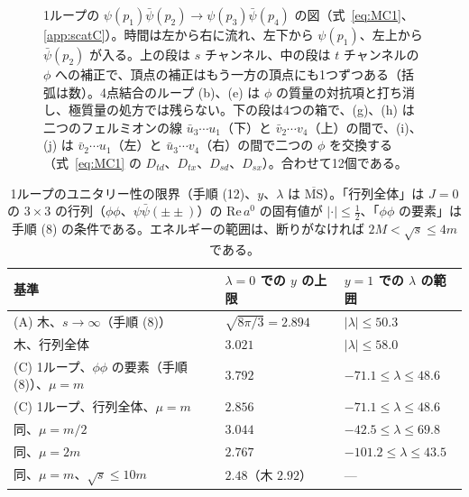 \documentclass[a4paper,10pt]{ltjsarticle}
\newcommand{\MSbar}{\overline{\mathrm{MS}}}
\begin{document}
\begin{figure}[tbp]
\caption{1ループの $\psi(p_1)\bar\psi(p_2)\to\psi(p_3)\bar\psi(p_4)$ の図（式~\eqref{eq:MC1}、\ref{app:scatC}）。時間は左から右に流れ、左下から $\psi(p_1)$、左上から $\bar\psi(p_2)$ が入る。上の段は $s$ チャンネル、中の段は $t$ チャンネルの $\phi$ への補正で、頂点の補正はもう一方の頂点にも1つずつある（括弧は数）。4点結合のループ (b)、(e) は $\phi$ の質量の対抗項と打ち消し、極質量の処方では残らない。下の段は4つの箱で、(g)、(h) は二つのフェルミオンの線 $\bar u_3\cdots u_1$（下）と $\bar v_2\cdots v_4$（上）の間で、(i)、(j) は $\bar v_2\cdots u_1$（左）と $\bar u_3\cdots v_4$（右）の間で二つの $\phi$ を交換する（式~\eqref{eq:MC1} の $D_{td}$、$D_{tx}$、$D_{sd}$、$D_{sx}$）。合わせて12個である。}
\label{fig:loopC}
\end{figure}

\begin{table}[tbp]
\centering\small
\caption{1ループのユニタリー性の限界（手順 (12)、$y$、$\lambda$ は $\MSbar$）。「行列全体」は $J=0$ の $3\times3$ の行列（$\phi\phi$、$\psi\bar\psi(\pm\pm)$）の $\mathrm{Re}\,a^0$ の固有値が $|\cdot|\le\frac12$、「$\phi\phi$ の要素」は手順 (8) の条件である。エネルギーの範囲は、断りがなければ $2M<\sqrt s\le4m$ である。}
\label{tab:scatC}
\setlength{\tabcolsep}{5pt}
\begin{tabular}{lll}
\toprule
基準 & $\lambda=0$ での $y$ の上限 & $y=1$ での $\lambda$ の範囲 \\
\midrule
(A) 木、$s\to\infty$（手順 (8)） & $\sqrt{8\pi/3}=2.894$ & $|\lambda|\le50.3$ \\
木、行列全体 & $3.021$ & $|\lambda|\le58.0$ \\
(C) 1ループ、$\phi\phi$ の要素（手順 (8)）、$\mu=m$ & $3.792$ & $-71.1\le\lambda\le48.6$ \\
(C) 1ループ、行列全体、$\mu=m$ & $2.856$ & $-71.1\le\lambda\le48.6$ \\
同、$\mu=m/2$ & $3.044$ & $-42.5\le\lambda\le69.8$ \\
同、$\mu=2m$ & $2.767$ & $-101.2\le\lambda\le43.5$ \\
同、$\mu=m$、$\sqrt s\le10m$ & $2.48$（木 $2.92$） & — \\
\bottomrule
\end{tabular}
\end{table}
\end{document}
